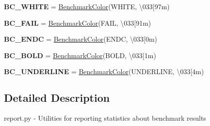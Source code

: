 \begin{DoxyCompactItemize}
\item 
\mbox{\label{namespacegbench_1_1report_a424090a008a5f71f7e3bf9e746ef2d25}} 
{\bfseries B\+C\+\_\+\+W\+H\+I\+TE} = \mbox{\hyperlink{classgbench_1_1report_1_1_benchmark_color}{Benchmark\+Color}}(\textquotesingle{}W\+H\+I\+TE\textquotesingle{}, \textquotesingle{}\textbackslash{}033\mbox{[}97m\textquotesingle{})
\item 
\mbox{\label{namespacegbench_1_1report_a4680db7ad759c343af20b9c2283edc2d}} 
{\bfseries B\+C\+\_\+\+F\+A\+IL} = \mbox{\hyperlink{classgbench_1_1report_1_1_benchmark_color}{Benchmark\+Color}}(\textquotesingle{}F\+A\+IL\textquotesingle{}, \textquotesingle{}\textbackslash{}033\mbox{[}91m\textquotesingle{})
\item 
\mbox{\label{namespacegbench_1_1report_a992f881c9b9331643383645508277090}} 
{\bfseries B\+C\+\_\+\+E\+N\+DC} = \mbox{\hyperlink{classgbench_1_1report_1_1_benchmark_color}{Benchmark\+Color}}(\textquotesingle{}E\+N\+DC\textquotesingle{}, \textquotesingle{}\textbackslash{}033\mbox{[}0m\textquotesingle{})
\item 
\mbox{\label{namespacegbench_1_1report_ac20cc3ebea2a11b8be3b26bd45ace356}} 
{\bfseries B\+C\+\_\+\+B\+O\+LD} = \mbox{\hyperlink{classgbench_1_1report_1_1_benchmark_color}{Benchmark\+Color}}(\textquotesingle{}B\+O\+LD\textquotesingle{}, \textquotesingle{}\textbackslash{}033\mbox{[}1m\textquotesingle{})
\item 
\mbox{\label{namespacegbench_1_1report_adccf0ccd28add3e7612494eab11a3d6b}} 
{\bfseries B\+C\+\_\+\+U\+N\+D\+E\+R\+L\+I\+NE} = \mbox{\hyperlink{classgbench_1_1report_1_1_benchmark_color}{Benchmark\+Color}}(\textquotesingle{}U\+N\+D\+E\+R\+L\+I\+NE\textquotesingle{}, \textquotesingle{}\textbackslash{}033\mbox{[}4m\textquotesingle{})
\end{DoxyCompactItemize}


\subsection{Detailed Description}
\begin{DoxyVerb}report.py - Utilities for reporting statistics about benchmark results
\end{DoxyVerb}
 

